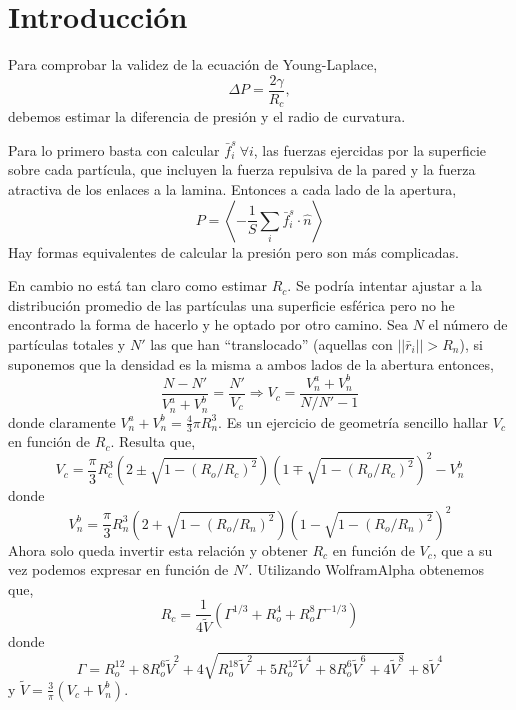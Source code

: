 \chapter{Introducción}
\label{cap:introduction}

Para comprobar la validez de la ecuación de Young-Laplace,
\begin{equation}
    \Delta P=\frac{2\gamma}{R_c},
\end{equation}
debemos estimar la diferencia de presión y el radio de curvatura.

Para lo primero basta con calcular $\bar{f}^s_i \ \forall i$, las fuerzas ejercidas por la superficie sobre cada partícula, que incluyen la fuerza repulsiva de la pared y la fuerza atractiva de los enlaces a la lamina. Entonces a cada lado de la apertura,
\begin{equation}
    P=\left\langle-\frac{1}{S}\sum_i\bar{f}^s_i\cdot\hat{n}\right\rangle
\end{equation}
Hay formas equivalentes de calcular la presión pero son más complicadas.

En cambio no está tan claro como estimar $R_c$. Se podría intentar ajustar a la distribución promedio de las partículas una superficie esférica pero no he encontrado la forma de hacerlo y he optado por otro camino. Sea $N$ el número de partículas totales y $N'$ las que han ``translocado'' (aquellas con $||\bar{r}_i||>R_n$), si suponemos que la densidad es la misma a ambos lados de la abertura entonces,
\begin{equation}
    \frac{N-N'}{V_n^a+V_n^b}=\frac{N'}{V_c}\Rightarrow V_c=\frac{V_n^a+V_n^b}{N/N'-1}
\end{equation}
donde claramente $V_n^a+V_n^b=\tfrac{4}{3}\pi R_n^3$. Es un ejercicio de geometría sencillo hallar $V_c$ en función de $R_c$. Resulta que,
\begin{equation}
    V_c=\frac{\pi}{3}R_c^3\left(2\pm\sqrt{1-(R_o/R_c)^2}\right)\left(1\mp\sqrt{1-(R_o/R_c)^2}\right)^2-V_n^b
\end{equation}
donde
\begin{equation}
    V_n^b=\frac{\pi}{3}R_n^3\left(2+\sqrt{1-(R_o/R_n)^2}\right)\left(1-\sqrt{1-(R_o/R_n)^2}\right)^2
\end{equation}
Ahora solo queda invertir esta relación y obtener $R_c$ en función de $V_c$, que a su vez podemos expresar en función de $N'$. Utilizando WolframAlpha obtenemos que,
\begin{equation}
    R_c=\frac{1}{4\tilde{V}}\left(\Gamma^{1/3}+R_o^4+R_o^8\Gamma^{-1/3}\right)
\end{equation}
donde
\begin{equation}
    \Gamma=R_o^{12}+8R_o^6\tilde{V}^2+4\sqrt{R_o^{18}\tilde{V}^2+5R_o^{12}\tilde{V}^4+8R_o^6\tilde{V}^6+4\tilde{V}^8}+8\tilde{V}^4
\end{equation}
y $\tilde{V}=\frac{3}{\pi}\left(V_c+V_n^b\right)$.

